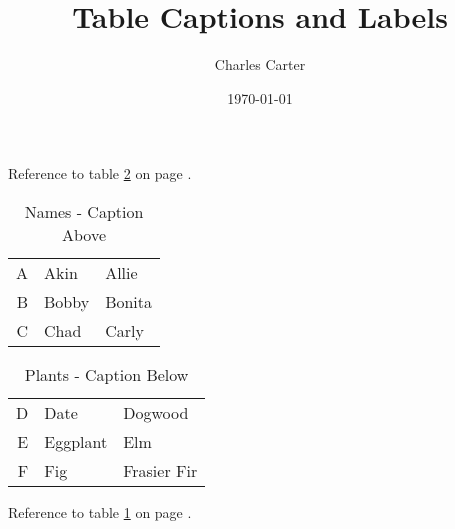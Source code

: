 \documentclass{article}
\title{Table Captions and Labels}
\author{Charles Carter}
\date{\today{}}
\begin{document}
 
    \maketitle{}
    \listoftables{}
Reference to table \ref{Plants} on page \pageref{Plants}.
    \begin{table}
        \caption{Names - Caption Above \label{Names}}
        \begin{tabular}{r | l l}
            \hline
            A & Akin & Allie \\
            B & Bobby & Bonita \\
            C & Chad & Carly \\
            \hline
        \end{tabular}
    \end{table}
    \newpage
    \begin{table}
        \begin{tabular}{r | l l}
            \hline
            D & Date & Dogwood  \\
            E & Eggplant & Elm \\
            F & Fig & Frasier Fir \\
            \hline
        \end{tabular}
        \caption{Plants - Caption Below \label{Plants}}
    \end{table}
    Reference to table \ref{Names} on page \pageref{Names}.
\end{document}
